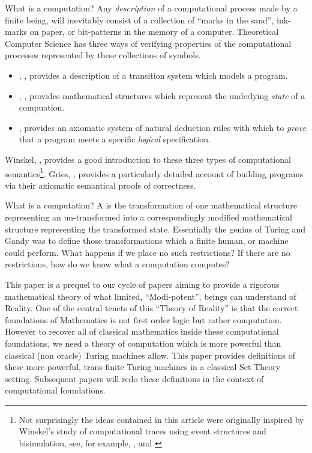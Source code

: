 \documentclass[a4paper]{amsart}
\begin{document}
What is a computation? Any \emph{description} of a computational process made by a finite
being, will inevitably consist of a collection of ``marks in the sand'', ink-marks on
paper, or bit-patterns in the memory of a computer. Theoretical Computer Science has three
ways of verifying properties of the computational processes represented by these
collections of symbols. 
%
\begin{itemize}
%
\item {},
\cite{plotkin1981structuralOperationalSemantics}, provides a description of a transition 
system which models a program.
%
\item {}, \cite{scott1970theoryComputation, stoy1981scottStracheyTheory}, provides
mathematical structures which represent the underlying \emph{state} of a compuation.
%
\item {}, \cite{floyd1967programSemantics, 
hoare1969axiomaticSemantics} provides an axiomatic system of natural deduction rules with 
which to \emph{prove} that a program meets a specific \emph{logical} specification.
%
\end{itemize}
%
Winskel, \cite{winskel1993formalSemanticsProgrammingLanguages}, provides a good
introduction to these three types of computational semantics\footnote{Not surprisingly the
ideas contained in this article were originally inspired by Winskel's study of
computational traces using event structures and bisimulation, see, for example,
\cite{winskel2007eventStructures}, and \cite{joyalNielsenWinskel1996bisimulation}}. Gries,
\cite{gries1981scienceProgramming}, provides a particularly detailed account of building
programs via their axiomatic semantical proofs of correctness.

What is a computation? A  is the transformation of one mathematical
structure representing an un-transformed  into a correspondingly modified
mathematical structure representing the transformed state. Essentially the genius of
Turing and Gandy was to define those transformations which a finite human, or machine
could perform. What happens if we place no such restrictions? If there are no
restrictions, how do we know what a computation computes?


This paper is a prequel to our cycle of papers aiming to provide a rigorous mathematical
theory of what limited, ``Modi-potent'', beings can understand of Reality. One of the
central tenets of this ``Theory of Reality'' is that the correct foundations of
Mathematics is not first order logic but rather computation. However to recover all of
classical mathematics inside these computational foundations, we need a theory of
computation which is more powerful than classical (non oracle) Turing machines allow. This
paper provides definitions of these more powerful, trans-finite Turing machines in a
classical Set Theory setting. Subsequent papers will redo these definitions in the context
of computational foundations.
\end{document}
